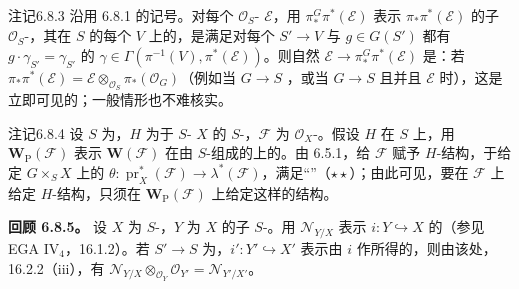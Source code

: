 \begin{SGAresult}{注记}{6.8.3}
沿用 6.8.1 的记号。对每个 $\mathcal O_S$- $\mathcal E$，用 $\pi_*^G\pi^*(\mathcal E)$ 表示 $\pi_*\pi^*(\mathcal E)$ 的子 $\mathcal O_S$-，其在 $S$ 的每个 $V$ 上的，是满足对每个 $S'\to V$ 与 $g\in G(S')$ 都有 $g\cdot\gamma_{S'}=\gamma_{S'}$ 的 $\gamma\in\Gamma(\pi^{-1}(V),\pi^*(\mathcal E))$。则自然 $\mathcal E\to\pi_*^G\pi^*(\mathcal E)$ 是：若 $\pi_*\pi^*(\mathcal E)=\mathcal E\otimes_{\mathcal O_S}\pi_*(\mathcal O_G)$（例如当 $G\to S$ ，或当 $G\to S$ 且并且 $\mathcal E$ 时），这是立即可见的；一般情形也不难核实。
\end{SGAresult}
\begin{SGAresult}{注记}{6.8.4}
设 $S$ 为，$H$ 为于 $S$- $X$ 的 $S$-，$\mathcal F$ 为 $\mathcal O_X$-。假设 $H$ 在 $S$ 上，用 $\mathbf W_{\mathrm P}(\mathcal F)$ 表示 $\mathbf W(\mathcal F)$ 在由 $S$-组成的上的。由 6.5.1，给 $\mathcal F$ 赋予 $H$-结构，于给定 $G\times_S X$ 上的 $\theta:\operatorname{pr}_X^*(\mathcal F)\to\lambda^*(\mathcal F)$，满足“”（$\star\star$）；由此可见，要在 $\mathcal F$ 上给定 $H$-结构，只须在 $\mathbf W_{\mathrm P}(\mathcal F)$ 上给定这样的结构。
\end{SGAresult}
\textbf{回顾 6.8.5。} 设 $X$ 为 $S$-，$Y$ 为 $X$ 的子 $S$-。用 $\mathcal N_{Y/X}$ 表示 $i:Y\hookrightarrow X$ 的（参见 EGA $\mathrm{IV}_4$，16.1.2）。若 $S'\to S$ 为，$i':Y'\hookrightarrow X'$ 表示由 $i$ 作所得的，则由该处，16.2.2（iii），有 $\mathcal N_{Y/X}\otimes_{\mathcal O_Y}\mathcal O_{Y'}=\mathcal N_{Y'/X'}$。

